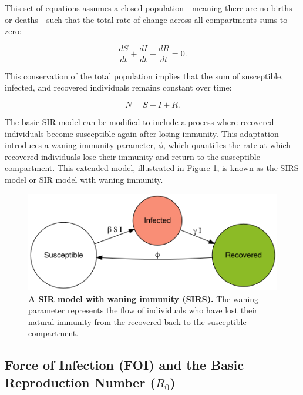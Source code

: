 \documentclass[
11pt, %
oneside, %
english, %
singlespacing, %
]{macthesis} %
\begin{document}
This set of equations assumes a closed population---meaning there are no births or deaths---such that the total rate of change across all compartments sums to zero:

\[
\frac{dS}{dt} + \frac{dI}{dt} + \frac{dR}{dt} = 0.
\]

This conservation of the total population implies that the sum of susceptible, infected, and recovered individuals remains constant over time:

\[
N = S + I + R.
\]

The basic SIR model can be modified to include a process where recovered individuals become susceptible again after losing immunity. This adaptation introduces a waning immunity parameter, \(\phi\), which quantifies the rate at which recovered individuals lose their immunity and return to the susceptible compartment. This extended model, illustrated in Figure \ref{fig:sirs}, is known as the SIRS model or SIR model with waning immunity.

\begin{figure}[H]
\centering
\includegraphics[width=\textwidth]{figure/sirs_model.png}
\caption[Susceptible-Infected-Recovered-Susceptible (SIRS) model]{\textbf{A SIR model with waning immunity (SIRS).} The waning parameter represents the flow of individuals who have lost their natural immunity from the recovered back to the susceptible compartment.}
\label{fig:sirs}
\end{figure}

\subsection{\texorpdfstring{Force of Infection (FOI) and the Basic Reproduction Number (\(R_0\))}{Force of Infection (FOI) and the Basic Reproduction Number (R\_0)}}\label{FOI-and-R0}
\end{document}
